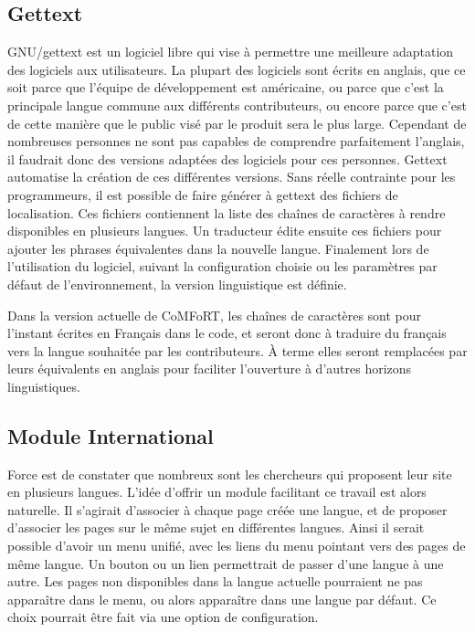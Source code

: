 \documentclass[final,11pt,a4paper,twoside,titlepage]{article}
\begin{document}
{    \subsection{Gettext}
    GNU/gettext est un logiciel libre qui vise à permettre une meilleure
    adaptation des logiciels aux utilisateurs. La plupart des logiciels
    sont écrits en anglais, que ce soit parce que l'équipe de
    développement est américaine, ou parce que c'est la principale langue
    commune aux différents contributeurs, ou encore parce que c'est de cette
    manière que le public visé par le produit sera le plus
    large. Cependant de nombreuses personnes ne sont pas capables de
    comprendre parfaitement l'anglais, il faudrait donc des versions
    adaptées des logiciels pour ces personnes. Gettext automatise la
    création de ces différentes versions. Sans réelle contrainte pour
    les programmeurs, il est possible de faire générer à gettext des
    fichiers de localisation. Ces fichiers contiennent la liste des
    chaînes de caractères à rendre disponibles en plusieurs langues. Un
    traducteur édite ensuite ces fichiers pour ajouter les phrases
    équivalentes dans la nouvelle langue. Finalement lors de
    l'utilisation du logiciel, suivant la configuration choisie ou les
    paramètres par défaut de l'environnement, la version linguistique
    est définie.

    Dans la version actuelle de CoMFoRT, les chaînes de caractères sont
    pour l'instant écrites en Français dans le code, et seront donc à
    traduire du français vers la langue souhaitée par les
    contributeurs. À terme elles seront remplacées par leurs équivalents
    en anglais pour faciliter l'ouverture à d'autres horizons linguistiques.
    
    \subsection{Module International}

    Force est de constater que nombreux sont les chercheurs qui proposent
    leur site en plusieurs langues. L'idée d'offrir un module facilitant
    ce travail est alors naturelle. Il s'agirait d'associer à chaque
    page créée une langue, et de proposer d'associer les pages sur le
    même sujet en différentes langues. Ainsi il serait possible d'avoir
    un menu unifié, avec les liens du menu pointant vers des pages de
    même langue. Un bouton ou un lien permettrait de passer d'une langue
    à une autre. Les pages non disponibles dans la langue actuelle
    pourraient ne pas apparaître dans le menu, ou alors apparaître dans
    une langue par défaut. Ce choix pourrait être fait via une option de
    configuration.

}
\end{document}
